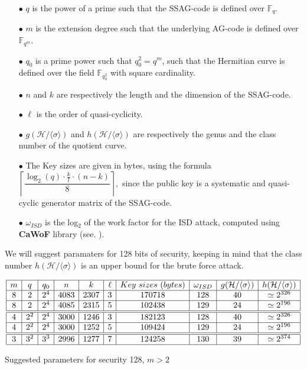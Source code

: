 \documentclass[10pt]{article}
\theoremstyle{definition}
\theoremstyle{definition}
\theoremstyle{definition}
\newcommand{\s}{\vspace{0.3cm}}
\newcommand{\cd}{\cdot}
\newcommand{\calH}{\mathcal{H}}
\newcommand{\fqm}{\mathbb{F}_{q^m}}
\newcommand{\fq}{\mathbb{F}_q}
\newcommand{\w}{\omega}
\begin{document}
\begin{enumerate}
\item[$\bullet$] $q$ is the power of a prime such that the SSAG-code is defined over $\fq$.
\item[$\bullet$] $m$ is the extension degree such that the underlying AG-code is defined over $\fqm$.
\item[$\bullet$] $q_0$ is a prime power such that $q_0^2=q^m$, such that the Hermitian curve is defined over the field $\mathbb{F}_{q_0^2}$ with square cardinality.
\item[$\bullet$] $n$ and $k$ are respectively the length and the dimension of the SSAG-code.
\item[$\bullet$] $\ell$ is the order of quasi-cyclicity.  
\item[$\bullet$] $g(\calH/\langle \sigma \rangle)$ and $h(\calH/\langle \sigma \rangle)$ are respectively the genus and the class number of the quotient curve.
\item[$\bullet$] The Key sizes are given in bytes, using the formula $\left\lceil \dfrac{\log_{2}(q) \cd \frac{k}{l} \cd (n-k)}{8} \right\rceil,$ since the public key is a systematic and quasi-cyclic generator matrix of the SSAG-code.
\item[$\bullet$] $\w_{ISD}$ is the log$_2$ of the work factor for the ISD attack, computed using \textbf{CaWoF} library (see. \cite{CAWOF}).
\end{enumerate}
We will suggest paramaters for 128 bits of security, keeping in mind that the class number $h(\calH/\langle \sigma \rangle)$ is an upper bound for the brute force attack. 

\s

\begin{table}[htbp]
\begin{equation*}
\begin{array}{|c|c|c|c|c|c|c|c|c|c|}
\hline
m & q & q_0 & n & k & \ell & Key \ sizes \ (bytes) & \w_{ISD} & g(\calH/\langle \sigma \rangle) & h(\calH/\langle \sigma \rangle) \\
\hline
8 & 2 & 2^4 & 4083 & 2307 & 3 & 170718 & 128 & 40 & \simeq 2^{326} \\
\hline
8 & 2 & 2^4 & 4085 & 2315 & 5 & 102438 & 129 & 24 & \simeq 2^{196} \\
\hline \hline
4 & 2^2 & 2^4 & 3000 & 1246 & 3 & 182123 & 128 & 40 & \simeq 2^{326} \\
\hline
4 & 2^2 & 2^4 & 3000 & 1252 & 5 & 109424 & 129 & 24 & \simeq 2^{196} \\
\hline \hline
3 & 3^2 & 3^3 & 2996 & 1277 & 7 & 124258 & 130 & 39 & \simeq 2^{374} \\
\hline
\end{array}
\end{equation*}
\caption{Suggested parameters for security 128, $m > 2$}
\end{table}
\end{document}
